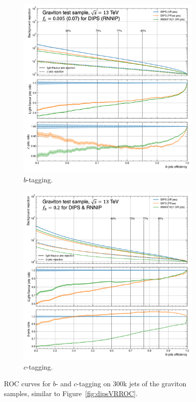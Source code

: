 \begin{figure}[h!]
  \centering
  \begin{subfigure}[t]{0.48\textwidth}
    \centering
    \includegraphics[width=\textwidth]{Images/FTAG/VRDips/ROC/grb.png}
    \caption{$b$-tagging.}
    \label{fig:dipsVRROCgr}
  \end{subfigure}
  \begin{subfigure}[t]{0.48\textwidth}
    \centering
    \includegraphics[width=\textwidth]{Images/FTAG/VRDips/ROC/grc.png}
    \caption{$c$-tagging.}
    \label{fig:dipsVRROCgrc}
  \end{subfigure}
  \caption{ROC curves for $b$- and $c$-tagging on 300k jets of the graviton samples, similar to Figure~\ref{fig:dipsVRROC}.}
  \label{fig:dipsVRROCgrav}
\end{figure}

